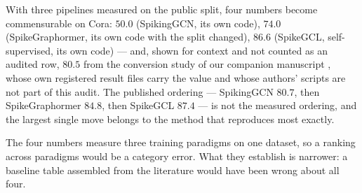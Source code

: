With three pipelines measured on the public split, four numbers become commensurable on Cora:
$50.0$ (SpikingGCN, its own code), $74.0$ (SpikeGraphormer, its own code with the split changed),
$86.6$ (SpikeGCL, self-supervised, its own code) --- and, shown for context and not counted as an
audited row, $80.5$ from the conversion study of our companion manuscript \citep{companion}, whose
own registered result files carry the value and whose authors' scripts are not part of this audit.
The published ordering --- SpikingGCN $80.7$, then SpikeGraphormer
$84.8$, then SpikeGCL $87.4$ --- is not the measured ordering, and the largest single move belongs to
the method that reproduces most exactly.

The four numbers measure three training paradigms on one dataset, so a ranking across paradigms
would be a category error. What they establish is narrower: a baseline table assembled from the
literature would have been wrong about all four.
